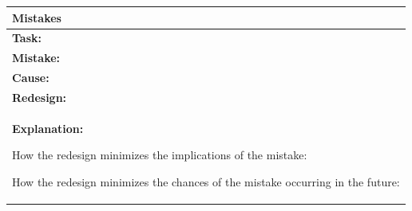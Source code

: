 \documentclass[a4paper,11pt,oneside]{scrreprt}
\begin{document}
\begin{tabularx}{\textwidth}{|X|}
	\hline
		\textbf{Mistakes}
		\\
	\hline
		\textbf{Task:}
		\\
	\hline
		\textbf{Mistake:}
		
		\\
		
		\textbf{Cause:}
		\\
	\hline
		\textbf{Redesign:}
		
		\\
		
		\textbf{Explanation:}
		
			\begin{compactenum}[	a)]
				\item How the redesign minimizes the implications of the mistake:
				\item How the redesign minimizes the chances of the mistake occurring in the future:
			\end{compactenum}
	\\
	\hline
	
	
	
	
	
\end{tabularx}\\
\end{document}
